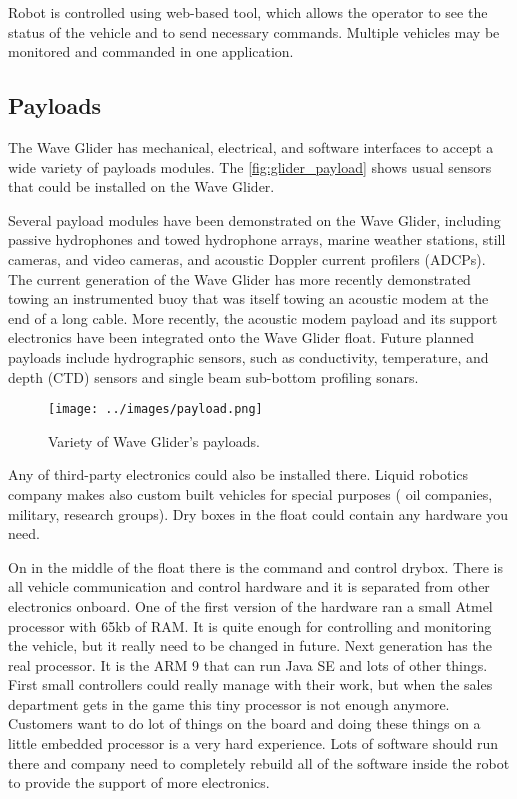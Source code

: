 Robot is controlled using web-based tool, which allows the operator to see the status of the vehicle and to send necessary commands. Multiple vehicles may be monitored and commanded in one application.



\subsection{Payloads}

The Wave Glider has mechanical, electrical, and software interfaces to accept a wide variety of payloads modules.  The \autoref{fig:glider_payload}  shows usual sensors that could be installed on the Wave Glider.

Several payload modules have been demonstrated on the Wave Glider, including passive hydrophones and towed hydrophone arrays, marine weather stations, still cameras, and video cameras, and acoustic Doppler current profilers (ADCPs). The current generation of the Wave Glider has more recently demonstrated towing an instrumented buoy that was itself towing an acoustic modem at the end of a long cable. More recently, the acoustic modem payload and its support electronics have been integrated onto the Wave Glider float. Future planned payloads include hydrographic sensors, such as conductivity, temperature, and depth (CTD) sensors and single beam sub-bottom profiling sonars.\cite{5422129}

\begin{center}
  \begin{figure}[H]	
	\texttt{[image: ../images/payload.png]}		
	\caption{Variety of Wave Glider's payloads. \cite{spec:glider_spec} } 
	\label{fig:glider_payload}  
  \end{figure}
\end{center} 

Any of third-party electronics could also be installed there. Liquid robotics company makes also custom built vehicles  for special purposes ( oil companies, military,  research groups). Dry boxes in the float could contain any hardware you need. 

On in the middle  of the float there is the command and control drybox. There is all vehicle communication and control hardware and it is separated from other electronics onboard. One of the first version  of the hardware ran a small Atmel processor with 65kb of RAM. It is quite enough for controlling and monitoring the vehicle, but it really need to be changed in future. Next generation has the real processor. It is the ARM 9  that can run Java SE and lots of other things. First small controllers could  really manage with their work, but when the sales department gets in the game this tiny processor is not enough anymore. Customers want to do lot of things on the board  and doing these things  on a little embedded processor is a very hard experience. Lots of software should run there and company need to completely rebuild  all of the software inside the robot to provide the support of more electronics.\cite{video:james_gosling_on_youtube}




